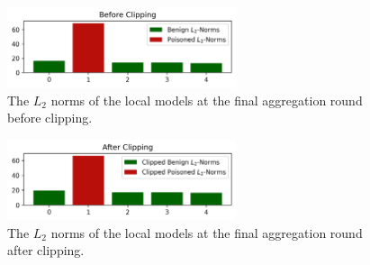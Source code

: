 \documentclass{article}
\begin{document}
\begin{figure}[h]
    \centering
    \includegraphics[width=0.6\textwidth]{before_clipping.png}
    \caption{The $L_2$ norms of the local models at the final aggregation round before clipping.}
    \label{fig:before_clipping}
\end{figure}

\begin{figure}[h]
    \centering
    \includegraphics[width=0.6\textwidth]{after_clipping.png}
    \caption{The $L_2$ norms of the local models at the final aggregation round after clipping.}
    \label{fig:after_clipping}
\end{figure}
\end{document}
